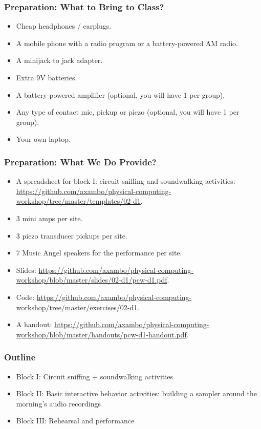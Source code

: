 \documentclass[screen, aspectratio=43]{beamer}
\begin{document}
%
\begin{frame}
  \frametitle{Preparation: What to Bring to Class?}
        \begin{itemize}
        \item Cheap headphones / earplugs.
        \item A mobile phone with a radio program or a battery-powered AM radio.
        \item A minijack to jack adapter.
        \item Extra 9V batteries.
        \item A battery-powered amplifier (optional, you will have 1 per group).
        \item Any type of contact mic, pickup or piezo (optional, you will have 1 per group).
        \item Your own laptop.
         \end{itemize}
\end{frame}
%
\begin{frame}
  \frametitle{Preparation: What We Do Provide?}
        \begin{itemize}
        \item A spreadsheet for block I: circuit sniffing and soundwalking activities: \url{https://github.com/axambo/physical-computing-workshop/tree/master/templates/02-d1}.
        \item 3 mini amps per site.
        \item 3 piezo transducer pickups per site.
        \item 7 Music Angel speakers for the performance per site.
        \item Slides: \url{https://github.com/axambo/physical-computing-workshop/blob/master/slides/02-d1/pcw-d1.pdf}.
        \item Code: \url{https://github.com/axambo/physical-computing-workshop/tree/master/exercises/02-d1}.
        \item A handout: \url{https://github.com/axambo/physical-computing-workshop/blob/master/handouts/pcw-d1-handout.pdf}.        
         \end{itemize}
\end{frame}
%
\begin{frame}
  \frametitle{Outline}
      \begin{itemize}
	\item Block I: Circuit sniffing + soundwalking activities
	\item Block II: Basic interactive behavior activities: building a sampler around the morning's audio recordings
	\item Block III: Rehearsal and performance
    \end{itemize}  
\end{frame}
\end{document}
